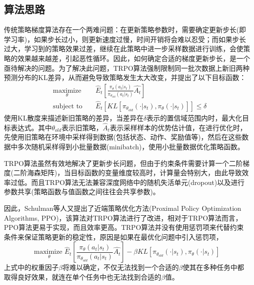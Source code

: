 \documentclass[bachelor]{thesis-uestc}
\begin{document}
	\subsection{算法思路}\label{ppocontent}
	传统策略梯度算法存在一个两难问题：在更新策略参数时，需要确定更新步长(即学习率)，如果步长过小，则更新速度过慢，时间开销将会难以忍受；而如果步长过大，学习到的策略效果过差，继续在此策略中进一步采样数据进行训练，会使策略的效果越来越差，引起恶性循环。因此，如何确定合适的梯度更新步长，是一个亟待解决的问题。为了解决此问题，TRPO算法强制限制同一批次数据上新旧两种预测分布的KL差异，从而避免导致策略发生太大改变，并提出了以下目标函数：
	\begin{equation*}
	\begin{aligned}
		& \underset{\theta}{\text{maximize}}& & \hat{E}_t[\frac{\pi_\theta(a_t|s_t)}{\pi_{\theta_{old}}(a_t|s_t)}\hat{A_t}]\\
		& \text{subject to }& &\hat{E}_t[KL[\pi_{\theta_{old}}(\cdot|s_t),\pi_\theta(\cdot|s_t)]]\leq \delta
	\end{aligned}
	\end{equation*}
	使用KL散度来描述新旧策略的差异，当差异在$\delta$表示的置信域范围内时，最大化目标表达式。其中$\theta_{old}$表示旧策略，$\hat{A}_t$表示采样样本的优势估计值，在进行优化时，先使用旧策略在环境中采样得到数据(包括状态、动作、奖励值等)，然后在这些数据中多次随机采样得到小批量数据(minibatch)，使用小批量数据优化策略函数。
	
	TRPO算法虽然有效地解决了更新步长问题，但由于约束条件需要计算一个二阶梯度(二阶海森矩阵)，当目标函数的变量维度较高时，计算量会特别大，由此导致效率过低。而且TRPO算法无法兼容深度网络中的随机失活单元(dropout)以及进行参数共享(策略函数与值函数之间往往会共享参数)。
	
	因此，Schulman等人\cite{Schulman2017Proximal}又提出了近端策略优化方法(Proximal Policy Optimization Algorithms, PPO)，该算法对TRPO算法进行了改进，相对于TRPO算法而言，PPO算法更易于实现，而且效率更高。TRPO算法并没有使用惩罚项来代替约束条件来保证策略更新的稳定性，原因是如果在最优化问题中引入惩罚项，
	\begin{equation}
		\label{eq27}	
		\underset{\theta}{\text{maximize }} \hat{E}_t[\frac{\pi_\theta(a_t|s_t)}{\pi_{\theta_{old}}(a_t|s_t)}\hat{A_t}]-\beta KL[\pi_{\theta_{old}}(\cdot|s_t),\pi_\theta(\cdot|s_t)]
	\end{equation}
	上式中的权重因子$\beta$将难以确定，不仅无法找到一个合适的$\beta$使其在多种任务中都取得良好效果，就连在单个任务中也无法找到合适的$\beta$值。
	
\end{document}

